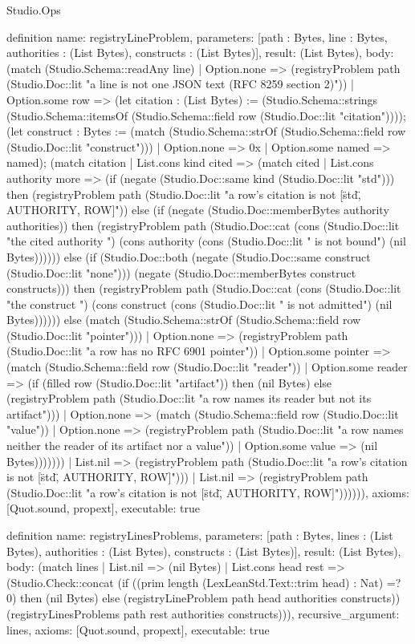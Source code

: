 \begin{lexlean}{Studio.Ops}
\begin{semanticmodule}
{definition{
  name: registryLineProblem,
  parameters: [path : Bytes, line : Bytes, authorities : (List Bytes), constructs : (List Bytes)],
  result: (List Bytes),
  body: (match (Studio.Schema::readAny line)
    | Option.none => (registryProblem path (Studio.Doc::lit "a line is not one JSON text (RFC 8259 section 2)"))
    | Option.some row => (let citation : (List Bytes) := (Studio.Schema::strings (Studio.Schema::itemsOf (Studio.Schema::field row (Studio.Doc::lit "citation")))); (let construct : Bytes := (match (Studio.Schema::strOf (Studio.Schema::field row (Studio.Doc::lit "construct")))
      | Option.none => 0x
      | Option.some named => named); (match citation
      | List.cons kind cited => (match cited
        | List.cons authority more => (if (negate (Studio.Doc::same kind (Studio.Doc::lit "std"))) then (registryProblem path (Studio.Doc::lit "a row's citation is not [\"std\", AUTHORITY, ROW]")) else (if (negate (Studio.Doc::memberBytes authority authorities)) then (registryProblem path (Studio.Doc::cat (cons (Studio.Doc::lit "the cited authority ") (cons authority (cons (Studio.Doc::lit " is not bound") (nil Bytes)))))) else (if (Studio.Doc::both (negate (Studio.Doc::same construct (Studio.Doc::lit "none"))) (negate (Studio.Doc::memberBytes construct constructs))) then (registryProblem path (Studio.Doc::cat (cons (Studio.Doc::lit "the construct ") (cons construct (cons (Studio.Doc::lit " is not admitted") (nil Bytes)))))) else (match (Studio.Schema::strOf (Studio.Schema::field row (Studio.Doc::lit "pointer")))
          | Option.none => (registryProblem path (Studio.Doc::lit "a row has no RFC 6901 pointer"))
          | Option.some pointer => (match (Studio.Schema::field row (Studio.Doc::lit "reader"))
            | Option.some reader => (if (filled row (Studio.Doc::lit "artifact")) then (nil Bytes) else (registryProblem path (Studio.Doc::lit "a row names its reader but not its artifact")))
            | Option.none => (match (Studio.Schema::field row (Studio.Doc::lit "value"))
              | Option.none => (registryProblem path (Studio.Doc::lit "a row names neither the reader of its artifact nor a value"))
              | Option.some value => (nil Bytes)))))))
        | List.nil => (registryProblem path (Studio.Doc::lit "a row's citation is not [\"std\", AUTHORITY, ROW]")))
      | List.nil => (registryProblem path (Studio.Doc::lit "a row's citation is not [\"std\", AUTHORITY, ROW]")))))),
  axioms: [Quot.sound, propext],
  executable: true
}

definition{
  name: registryLinesProblems,
  parameters: [path : Bytes, lines : (List Bytes), authorities : (List Bytes), constructs : (List Bytes)],
  result: (List Bytes),
  body: (match lines
    | List.nil => (nil Bytes)
    | List.cons head rest => (Studio.Check::concat (if ((prim length (LexLeanStd.Text::trim head) : Nat) =? 0) then (nil Bytes) else (registryLineProblem path head authorities constructs)) (registryLinesProblems path rest authorities constructs))),
  recursive_argument: lines,
  axioms: [Quot.sound, propext],
  executable: true
}

}
\end{semanticmodule}
\end{lexlean}
